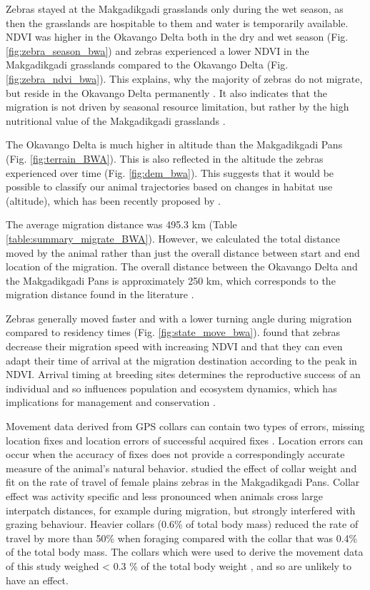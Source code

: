 \documentclass[12pt,a4paper, twoside, english]{article}
\begin{document}
Zebras stayed at the Makgadikgadi grasslands only during the wet season, as then the grasslands are hospitable to them and water is temporarily available. NDVI was higher in the Okavango Delta both in the dry and wet season (Fig. \ref{fig:zebra_season_bwa}) and zebras experienced a lower NDVI in the Makgadikgadi grasslands compared to the Okavango Delta (Fig. \ref{fig:zebra_ndvi_bwa}). This explains, why the majority of zebras do not migrate, but reside in the Okavango Delta permanently \citep{Bartlam-Brooks2013}. It also indicates that the migration is not driven by seasonal resource limitation, but rather by the high nutritional value of the Makgadikgadi grasslands \citep{Baillieul1979}.

The Okavango Delta is much higher in altitude than the Makgadikgadi Pans (Fig. \ref{fig:terrain_BWA}). This is also reflected in the altitude the zebras experienced over time (Fig. \ref{fig:dem_bwa}). This suggests that it would be possible to classify our animal trajectories based on changes in habitat use (altitude), which has been recently proposed by \cite{vanToor2016}.

The average migration distance was 495.3 km (Table \ref{table:summary_migrate_BWA}). However, we calculated the total distance moved by the animal rather than just the overall distance between start and end location of the migration. The overall distance between the Okavango Delta and the Makgadikgadi Pans is approximately 250 km, which corresponds to the migration distance found in the literature \citep{Bartlam-Brooks2013}.

Zebras generally moved faster and with a lower turning angle during migration compared to residency times (Fig. \ref{fig:state_move_bwa}). \cite{Bartlam-Brooks2013} found that zebras decrease their migration speed with increasing NDVI and that they can even adapt their time of arrival at the migration destination according to the peak in NDVI. Arrival timing at breeding sites determines the reproductive success of an individual and so influences population and ecosystem dynamics, which has implications for management and conservation \citep{Tibblin2016}.

Movement data derived from GPS collars can contain two types of errors, missing location fixes and location errors of successful acquired fixes \citep{Bjorneraas2010}. Location errors can occur when the accuracy of fixes does not provide a correspondingly accurate measure of the animal’s natural behavior. \cite{Brooks2008a} studied the effect of collar weight and fit on the rate of travel of female plains zebras in the Makgadikgadi Pans. Collar effect was activity specific and less pronounced when animals cross large interpatch distances, for example during migration, but strongly interfered with grazing behaviour. Heavier collars (0.6\% of total body mass) reduced the rate of travel by more than 50\% when foraging compared with the collar that was 0.4\% of the total body mass. The collars which were used to derive the movement data of this study weighed < 0.3 \% of the total body weight \citep{Bartlam-Brooks2013}, and so are unlikely to have an effect.
\end{document}
